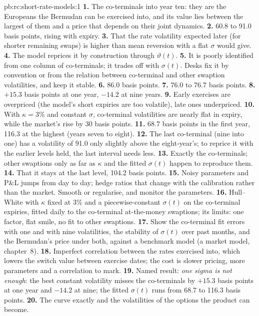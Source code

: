 \begin{solution}{pb:rc:short-rate-models:1}
\textbf{1.} The co-terminals into year ten: they are the Europeans the Bermudan can
be exercised into, and its value lies between the largest of them and a price
that depends on their joint dynamics.
\textbf{2.} 60.8 to 91.0 basis points, rising with expiry.
\textbf{3.} That the rate volatility expected later (for shorter remaining swaps) is
higher than mean reversion with a flat $\sigma$ would give.
\textbf{4.} The model reprices it by construction through $\vartheta(t)$.
\textbf{5.} It is poorly identified from one column of co-terminals; it trades off
with $\sigma(t)$. Desks fix it by convention or from the relation between
co-terminal and other swaption volatilities, and keep it stable.
\textbf{6.} 86.0 basis points.
\textbf{7.} 76.0 to 76.7 basis points.
\textbf{8.} $+15.3$ basis points at one year, $-14.2$ at nine years.
\textbf{9.} Early exercises are overpriced (the model's short expiries are too
volatile), late ones underpriced.
\textbf{10.} With $\kappa=3\%$ and constant $\sigma$, co-terminal volatilities are nearly flat in
expiry, while the market's rise by 30 basis points.
\textbf{11.} 68.7 basis points in the first year, 116.3 at the highest (years seven
to eight).
\textbf{12.} The last co-terminal (nine into one) has a volatility of 91.0 only
slightly above the eight-year's; to reprice it with the earlier levels held,
the last interval needs less.
\textbf{13.} Exactly the co-terminals; other swaptions only as far as $\kappa$ and the
fitted $\sigma(t)$ happen to reproduce them.
\textbf{14.} That it stays at the last level, 104.2 basis points.
\textbf{15.} Noisy parameters and P\&L jumps from day to day; hedge ratios that change
with the calibration rather than the market. Smooth or regularise, and monitor
the parameters.
\textbf{16.} Hull--White with $\kappa$ fixed at 3\% and a piecewise-constant $\sigma(t)$ on the
co-terminal expiries, fitted daily to the co-terminal at-the-money swaptions;
its limits: one factor, flat smile, no fit to other swaptions.
\textbf{17.} Show the co-terminal fit errors with one and with nine volatilities, the
stability of $\sigma(t)$ over past months, and the Bermudan's price under both,
against a benchmark model (a market model, chapter~8).
\textbf{18.} Imperfect correlation between the rates exercised into, which lowers the
switch value between exercise dates; the cost is slower pricing, more parameters
and a correlation to mark.
\textbf{19.} Named result: \emph{one sigma is not enough}: the best constant volatility
misses the co-terminals by $+15.3$ basis points at one year and $-14.2$ at nine;
the fitted $\sigma(t)$ runs from 68.7 to 116.3 basis points.
\textbf{20.} The curve exactly and the volatilities of the options the product can
become.
\end{solution}

